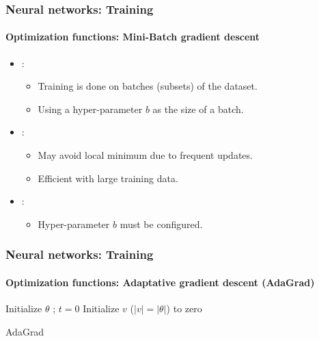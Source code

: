 \documentclass[xcolor=table]{beamer}
\begin{document}
\begin{frame}
	\frametitle{Neural networks: Training}
	\framesubtitle{Optimization functions: Mini-Batch gradient descent}

\begin{itemize}
	\item {}: 
	\begin{itemize}
		\item Training is done on batches (subsets) of the dataset.
		\item Using a hyper-parameter $b$ as the size of a batch.
	\end{itemize}
	\item {}: 
	\begin{itemize}
		\item May avoid local minimum due to frequent updates.
		\item Efficient with large training data.
	\end{itemize}
	\item {}: 
	\begin{itemize}
		\item Hyper-parameter $b$ must be configured.
	\end{itemize}
\end{itemize}

\end{frame}


\begin{frame}
	\frametitle{Neural networks: Training}
	\framesubtitle{Optimization functions: Adaptative gradient descent (AdaGrad)}

\begin{algorithm}[H]
	\KwResult{$ \theta $}
	Initialize $ \theta $ ; $ t = 0 $\;
	Initialize $v$ ($|v| = |\theta|$) to zero\;
	\caption{AdaGrad \cite{2011-duchi-al}}
\end{algorithm}

\end{frame}
\end{document}
